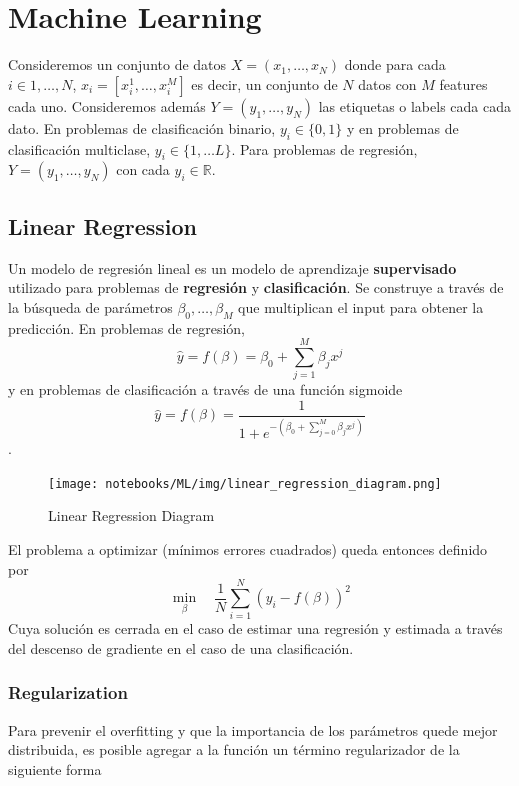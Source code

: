 \section{Machine Learning}

Consideremos un conjunto de datos $X = (x_1, \dots , x_N)$ donde para cada $i \in {1, \dots, N}$, $x_i = [x_{i}^1 , \dots, x_{i}^M]$ es decir, un conjunto de $N$ datos con $M$ features cada uno. Consideremos además $Y = (y_1, \dots , y_N)$ las etiquetas o labels cada cada dato. En problemas de clasificación binario, $y_i \in \{ 0, 1\}$ y en problemas de clasificación multiclase, $y_i \in \{1, \dots L\}$. Para problemas de regresión, $Y = (y_1, \dots , y_N)$ con cada $y_i \in \mathbb{R}$.

\subsection{Linear Regression}

Un modelo de regresión lineal es un modelo de aprendizaje \textbf{supervisado} utilizado para problemas de \textbf{regresión} y \textbf{clasificación}. Se construye a través de la búsqueda de parámetros $\beta_0, \dots, \beta_M$ que multiplican el input para obtener la predicción. En problemas de regresión, 
$$\hat{y} = f(\beta) = \beta_0 + \sum_{j=1}^M \beta_j x^j$$
y en problemas de clasificación a través de una función sigmoide 
$$\hat{y} = f(\beta) = \frac{1}{1+e^{- (\beta_0 + \sum_{j=0}^M \beta_j x^j)}}$$.

\begin{figure}[H]
    \center
    \texttt{[image: notebooks/ML/img/linear\_regression\_diagram.png]}
    \caption{Linear Regression Diagram}
\end{figure}

El problema a optimizar (mínimos errores cuadrados) queda entonces definido por 
$$\min_{\beta} \quad \frac{1}{N}\sum_{i=1}^N(y_i - f(\beta))^2$$
Cuya solución es cerrada en el caso de estimar una regresión y estimada a través del descenso de gradiente en el caso de una clasificación. 

\subsubsection{Regularization}

Para prevenir el overfitting y que la importancia de los parámetros quede mejor distribuida, es posible agregar a la función un término regularizador de la siguiente forma

